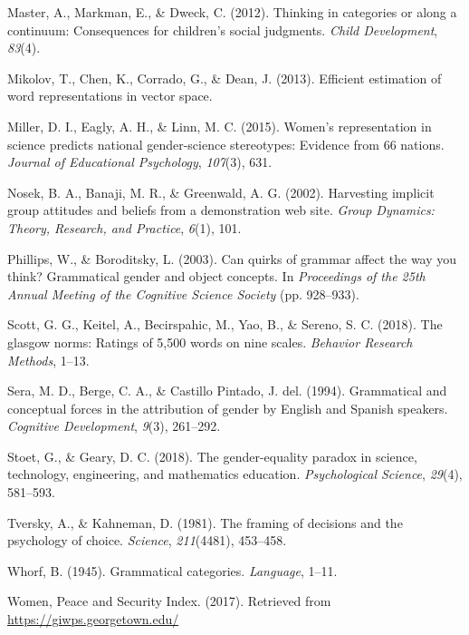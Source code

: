 \documentclass[man,floatsintext]{apa6}
\theoremstyle{definition}
\theoremstyle{definition}
\theoremstyle{definition}
\theoremstyle{remark}
\begin{document}
\hypertarget{ref-master2012thinking}{}
Master, A., Markman, E., \& Dweck, C. (2012). Thinking in categories or
along a continuum: Consequences for children's social judgments.
\emph{Child Development}, \emph{83}(4).

\hypertarget{ref-mikolov2013efficient}{}
Mikolov, T., Chen, K., Corrado, G., \& Dean, J. (2013). Efficient
estimation of word representations in vector space.

\hypertarget{ref-miller2015women}{}
Miller, D. I., Eagly, A. H., \& Linn, M. C. (2015). Women's
representation in science predicts national gender-science stereotypes:
Evidence from 66 nations. \emph{Journal of Educational Psychology},
\emph{107}(3), 631.

\hypertarget{ref-nosek2002harvesting}{}
Nosek, B. A., Banaji, M. R., \& Greenwald, A. G. (2002). Harvesting
implicit group attitudes and beliefs from a demonstration web site.
\emph{Group Dynamics: Theory, Research, and Practice}, \emph{6}(1), 101.

\hypertarget{ref-phillips2003can}{}
Phillips, W., \& Boroditsky, L. (2003). Can quirks of grammar affect the
way you think? Grammatical gender and object concepts. In
\emph{Proceedings of the 25th Annual Meeting of the Cognitive Science
Society} (pp. 928--933).

\hypertarget{ref-scott2018glasgow}{}
Scott, G. G., Keitel, A., Becirspahic, M., Yao, B., \& Sereno, S. C.
(2018). The glasgow norms: Ratings of 5,500 words on nine scales.
\emph{Behavior Research Methods}, 1--13.

\hypertarget{ref-sera1994grammatical}{}
Sera, M. D., Berge, C. A., \& Castillo Pintado, J. del. (1994).
Grammatical and conceptual forces in the attribution of gender by
English and Spanish speakers. \emph{Cognitive Development}, \emph{9}(3),
261--292.

\hypertarget{ref-stoet2018gender}{}
Stoet, G., \& Geary, D. C. (2018). The gender-equality paradox in
science, technology, engineering, and mathematics education.
\emph{Psychological Science}, \emph{29}(4), 581--593.

\hypertarget{ref-tversky1981framing}{}
Tversky, A., \& Kahneman, D. (1981). The framing of decisions and the
psychology of choice. \emph{Science}, \emph{211}(4481), 453--458.

\hypertarget{ref-whorf1945grammatical}{}
Whorf, B. (1945). Grammatical categories. \emph{Language}, 1--11.

\hypertarget{ref-wps}{}
Women, Peace and Security Index. (2017). Retrieved from
\url{https://giwps.georgetown.edu/}

\endgroup
\end{document}
